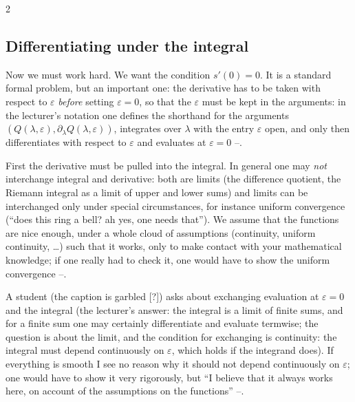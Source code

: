 \begin{paracol}{2}
\subsection{Differentiating under the integral}\label{ssec:var-diff}

Now we must work hard. We want the condition $s'(0)=0$. It is a standard formal problem, but an important one: the derivative has to be taken with respect to $\varepsilon$ \emph{before} setting $\varepsilon=0$, so that the $\varepsilon$ must be kept in the arguments: in the lecturer's notation one defines the shorthand for the arguments $(Q(\lambda,\varepsilon),\partial_\lambda Q(\lambda,\varepsilon))$, integrates over $\lambda$ with the entry $\varepsilon$ open, and only then differentiates with respect to $\varepsilon$ and evaluates at $\varepsilon=0$ --.

First the derivative must be pulled into the integral. In general one may \emph{not} interchange integral and derivative: both are limits (the difference quotient, the Riemann integral as a limit of upper and lower sums) and limits can be interchanged only under special circumstances, for instance uniform convergence (``does this ring a bell? ah yes, one needs that''). We assume that the functions are nice enough, under a whole cloud of assumptions (continuity, uniform continuity, \dots) such that it works, only to make contact with your mathematical knowledge; if one really had to check it, one would have to show the uniform convergence --.

\begin{coursenote}\label{cn:var-pullin}
A student (the caption is garbled [?]) asks about exchanging evaluation at $\varepsilon=0$ and the integral (the lecturer's answer: the integral is a limit of finite sums, and for a finite sum one may certainly differentiate and evaluate termwise; the question is about the limit, and the condition for exchanging is continuity: the integral must depend continuously on $\varepsilon$, which holds if the integrand does). If everything is smooth I see no reason why it should not depend continuously on $\varepsilon$; one would have to show it very rigorously, but ``I believe that it always works here, on account of the assumptions on the functions'' --.
\end{coursenote}


\end{paracol}
